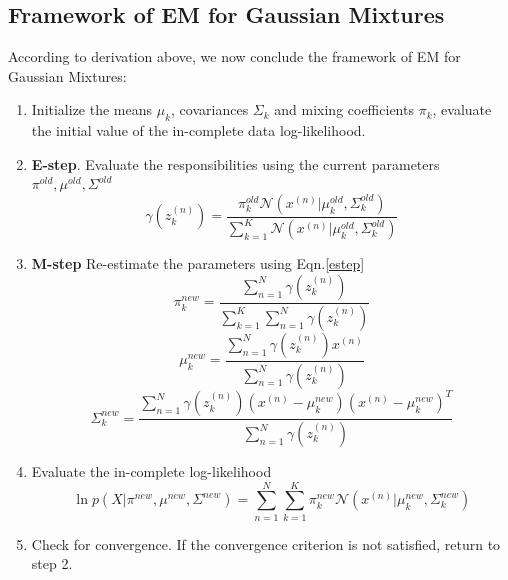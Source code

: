 \documentclass{article}
\begin{document}
\begin{spacing}{1.5}
\subsection{Framework of EM for Gaussian Mixtures}
According to derivation above, we now conclude the framework of EM for Gaussian Mixtures:
\begin{enumerate}
	\item Initialize the means $\mu_k$, covariances $\Sigma_k$ and mixing coefficients $\pi_k$, evaluate the initial value of the in-complete data log-likelihood.
	\item \textbf{E-step}. Evaluate the responsibilities using the current parameters $\pi^{old}, \mu^{old}, \Sigma^{old}$
		\begin{equation}
		\gamma(z^{(n)}_k) = \frac{\pi_k^{old} \mathcal{N}(x^{(n)}|\mu_k^{old}, \Sigma_k^{old})}{\sum_{k=1}^K \mathcal{N}(x^{(n)}|\mu_k^{old}, \Sigma_k^{old})}
		\label{estep}
		\end{equation}
	\item \textbf{M-step} Re-estimate the parameters using Eqn.\ref{estep}
		\begin{equation}
		\pi_k^{new} = \frac{\sum_{n=1}^N \gamma(z^{(n)}_k)}{\sum_{k=1}^K \sum_{n=1}^N \gamma(z^{(n)}_k)}
		\end{equation}
		\begin{equation}
		\mu_k^{new} = \frac{\sum_{n=1}^N \gamma(z^{(n)}_k) x^{(n)}}{ \sum_{n=1}^N \gamma(z^{(n)}_k)}
		\end{equation}
		\begin{equation}
		\Sigma_k^{new} = \frac{\sum_{n=1}^N \gamma (z^{(n)}_k) (x^{(n)}-\mu_k^{new})(x^{(n)}-\mu_k^{new})^T}{\sum_{n=1}^N \gamma (z^{(n)}_k)}
		\end{equation}
	\item Evaluate the in-complete log-likelihood
	\begin{equation}
	\ln p(X|\pi^{new},\mu^{new},\Sigma^{new}) = \sum_{n=1}^N \sum_{k=1}^K \pi_k^{new} \mathcal{N}(x^{(n)}|\mu_k^{new}, \Sigma_k^{new})
	\end{equation}
	\item Check for convergence. If the convergence criterion is not satisfied, return to step 2.
\end{enumerate}

\end{spacing}
\end{document}
